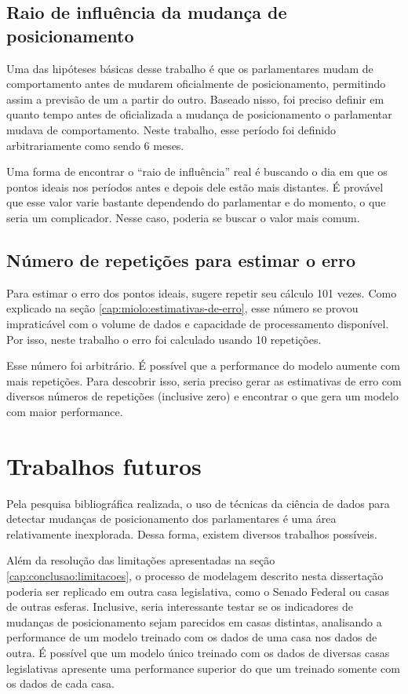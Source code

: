 \documentclass[a4paper,titlepage]{ppgi}\usepackage[]{graphicx}\usepackage[]{color}
\begin{document}
\subsection{Raio de influência da mudança de posicionamento}

Uma das hipóteses básicas desse trabalho é que os parlamentares mudam de
comportamento antes de mudarem oficialmente de posicionamento, permitindo assim
a previsão de um a partir do outro. Baseado nisso, foi preciso definir em
quanto tempo antes de oficializada a mudança de posicionamento o parlamentar
mudava de comportamento. Neste trabalho, esse período foi definido
arbitrariamente como sendo 6 meses.

Uma forma de encontrar o ``raio de influência'' real é buscando o dia em que os
pontos ideais nos períodos antes e depois dele estão mais distantes. É provável
que esse valor varie bastante dependendo do parlamentar e do momento, o que
seria um complicador. Nesse caso, poderia se buscar o valor mais comum.

\subsection{Número de repetições para estimar o erro}

Para estimar o erro dos pontos ideais,  sugere repetir
seu cálculo 101 vezes. Como explicado na seção
\ref{cap:miolo:estimativas-de-erro}, esse número se provou impraticável com o
volume de dados e capacidade de processamento disponível. Por isso, neste
trabalho o erro foi calculado usando 10 repetições.

Esse número foi arbitrário. É possível que a performance do modelo aumente com
mais repetições. Para descobrir isso, seria preciso gerar as estimativas de
erro com diversos números de repetições (inclusive zero) e encontrar o que gera
um modelo com maior performance.

\section{Trabalhos futuros}

Pela pesquisa bibliográfica realizada, o uso de técnicas da ciência de dados
para detectar mudanças de posicionamento dos parlamentares é uma área
relativamente inexplorada. Dessa forma, existem diversos trabalhos possíveis.

Além da resolução das limitações apresentadas na seção
\ref{cap:conclusao:limitacoes}, o processo de modelagem descrito nesta
dissertação poderia ser replicado em outra casa legislativa, como o Senado
Federal ou casas de outras esferas. Inclusive, seria interessante testar se os
indicadores de mudanças de posicionamento sejam parecidos em casas distintas,
analisando a performance de um modelo treinado com os dados de uma casa nos
dados de outra. É possível que um modelo único treinado com os dados de
diversas casas legislativas apresente uma performance superior do que
um treinado somente com os dados de cada casa.
\end{document}
